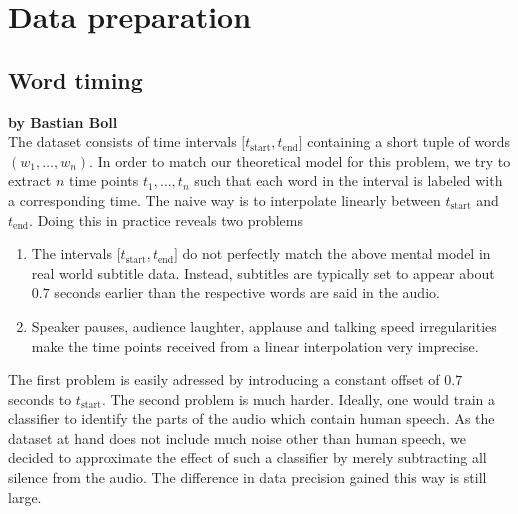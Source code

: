 \chapter{Data preparation}
\label{data_preparation}

\section{Word timing}

\textbf{by Bastian Boll} \\

The dataset consists of time intervals \(\lbrack t_\text{start}, t_\text{end}\rbrack\) containing a short tuple of words \((w_1,\dotsc,w_n)\). In order to match our theoretical model for this problem, we try to extract $n$ time points \(t_1,\dotsc,t_n\) such that each word in the interval is labeled with a corresponding time. The naive way is to interpolate linearly between \(t_\text{start}\) and \(t_\text{end}\). Doing this in practice reveals two problems
\begin{enumerate}
	\item The intervals \(\lbrack t_\text{start}, t_\text{end}\rbrack\) do not perfectly match the above mental model in real world subtitle data. Instead, subtitles are typically set to appear about $0.7$ seconds earlier than the respective words are said in the audio.
	\item Speaker pauses, audience laughter, applause and talking speed irregularities make the time points received from a linear interpolation very imprecise.
\end{enumerate}
The first problem is easily adressed by introducing a constant offset of $0.7$ seconds to $t_\text{start}$. The second problem is much harder. Ideally, one would train a classifier to identify the parts of the audio which contain human speech. As the dataset at hand does not include much noise other than human speech, we decided to approximate the effect of such a classifier by merely subtracting all silence from the audio. The difference in data precision gained this way is still large.

